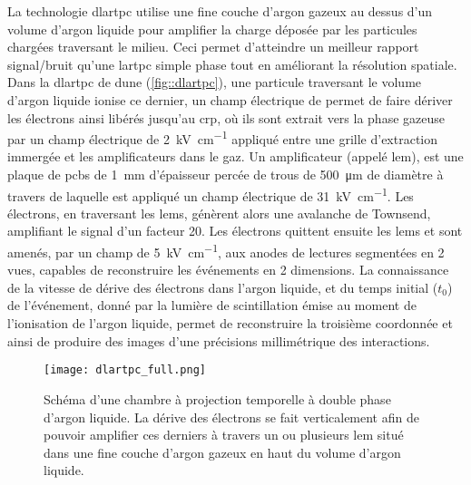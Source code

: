     La technologie \gls{dlartpc} utilise une fine couche d'argon gazeux au dessus d'un volume d'argon liquide pour amplifier la charge déposée par les particules chargées traversant le milieu. Ceci permet d'atteindre un meilleur rapport signal/bruit qu'une \gls{lartpc} simple phase tout en améliorant la résolution spatiale. Dans la \gls{dlartpc} de \gls{dune} (\autoref{fig::dlartpc}), une particule traversant le volume d'argon liquide ionise ce dernier, un champ électrique de \driftfield{} permet de faire dériver les électrons ainsi libérés jusqu'au \acrfull{crp}, où ils sont extrait vers la phase gazeuse par un champ électrique de \SI{2}{\kilo\volt\per\centi\meter} appliqué entre une grille d'extraction immergée et les amplificateurs dans le gaz. Un amplificateur (appelé \acrfull{lem}), est une plaque de \glspl{pcb} de \SI{1}{\milli\meter} d'épaisseur percée de trous de \SI{500}{\micro\meter} de diamètre à travers de laquelle est appliqué un champ électrique de  \SI{31}{\kilo\volt\per\centi\meter}. Les électrons, en traversant les \glspl{lem}, génèrent alors une avalanche de Townsend, amplifiant le signal d'un facteur 20. Les électrons quittent ensuite les \glspl{lem} et sont amenés, par un champ de  \SI{5}{\kilo\volt\per\centi\meter}, aux anodes de lectures segmentées en 2 vues, capables de reconstruire les événements en 2 dimensions. La connaissance de la vitesse de dérive des électrons dans l'argon liquide, et du temps initial ($t_0$) de l'événement, donné par la lumière de scintillation émise au moment de l'ionisation de l'argon liquide, permet de reconstruire la troisième coordonnée et ainsi de produire des images d'une précisions millimétrique des interactions.

    \begin{figure}[!htb]
      \centering
      \texttt{[image: dlartpc\_full.png]}
      \caption[Schéma d'une chambre à projection temporelle à double phase d'argon liquide]{\label{fig::dlartpc}Schéma d'une chambre à projection temporelle à double phase d'argon liquide. La dérive des électrons se fait verticalement afin de pouvoir amplifier ces derniers à travers un ou plusieurs \acrfull{lem} situé dans une fine couche d'argon gazeux en haut du volume d'argon liquide.}
    \end{figure}
    
